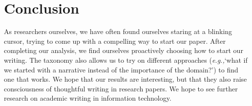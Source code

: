 \documentclass[sigconf,anonymous]{acmart}
\newcommand{\eg}{\textit{e.g.,}\xspace}
\begin{document}
	\section{Conclusion}
	
	As researchers ourselves, we have often found ourselves staring at a blinking cursor, trying to come up with a compelling way to start our paper. After completing our analysis, we find ourselves proactively choosing how to start our writing. The taxonomy also allows us to try on different approaches (\eg `what if we started with a narrative instead of the importance of the domain?') to find one that works. We hope that our results are interesting, but that they also raise consciousness of thoughtful writing in research papers. We hope to see further research on academic writing in information technology. 
	
	
	
	
\end{document}
